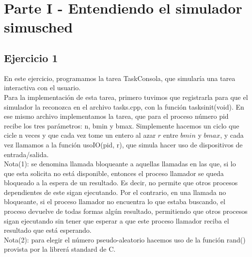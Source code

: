 \documentclass[a4paper]{article}
\begin{document}
\newpage
{}
\section{Parte I - Entendiendo el simulador simusched}

\subsection{Ejercicio 1}
En este ejercicio, programamos la tarea TaskConsola, que simular\'ia una tarea interactiva con
el usuario. \\
Para la implementaci\'on de esta tarea, primero tuvimos que registrarla para que el simulador la 
reconozca en el archivo tasks.cpp, con la funci\'on tasksinit(void). En ese mismo archivo implementamos
la tarea, que para el proceso n\'umero pid recibe los tres par\'ametros: n, bmin y bmax. Simplemente
hacemos un ciclo que cicle n veces y que cada vez tome un entero al azar $r$ entre $bmin$ y 
$bmax$, y cada vez llamamos a la funci\'on usoIO(pid, r), que simula hacer uso de dispositivos de
entrada/salida. \\
Nota(1): se denomina llamada bloqueante a aquellas llamadas en las que, si lo que esta  
solicita no est\'a disponible, entonces el proceso llamador se queda bloqueado a la espera de un
resultado. Es decir, no permite que otros procesos dependientes de este sigan ejecutando. Por 
el contrario, en una llamada no bloqueante, si el proceso llamador no encuentra lo que estaba
buscando, el proceso devuelve de todas formas alg\'un resultado, permitiendo que otros procesos
sigan ejecutando sin tener que esperar a que este proceso llamador reciba el resultado que est\'a
esperando. \\
Nota(2): para elegir el n\'umero pseudo-aleatorio hacemos uso de la funci\'on rand() provista
por la librer\'a standard de C. \\

\newpage
\end{document}
